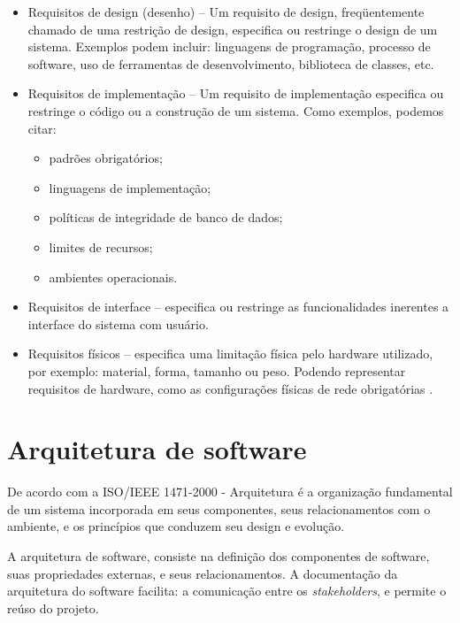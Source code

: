 \begin{itemize}
\item Requisitos de design (desenho) – Um requisito de design, freqüentemente chamado de uma restrição de design, especifica ou restringe o design de um sistema. Exemplos podem incluir: linguagens de programação, processo de software, uso de ferramentas de desenvolvimento, biblioteca de classes, etc.
\item Requisitos de implementação – Um requisito de implementação especifica ou restringe o código ou a construção de um sistema. Como exemplos, podemos citar:
\begin{itemize}

  \item padrões obrigatórios;
  \item linguagens de implementação;
  \item políticas de integridade de banco de dados;
  \item limites de recursos;
  \item ambientes operacionais.

\end{itemize}
\item Requisitos de interface – especifica ou restringe as funcionalidades inerentes a interface do sistema com usuário.
\item Requisitos físicos – especifica uma limitação física pelo hardware utilizado, por exemplo: material, forma, tamanho ou peso. Podendo representar requisitos de hardware, como as configurações físicas de rede obrigatórias \cite{rational}.
\end{itemize}

  \section{Arquitetura de software}
  \label{Sec:arquitetura}
    De acordo com a ISO/IEEE 1471-2000 - Arquitetura é a organização fundamental
  de um sistema incorporada em seus componentes, seus relacionamentos com o
  ambiente, e os princípios que conduzem seu design e evolução.

    A arquitetura de software, consiste na definição dos componentes de software,
     suas propriedades externas, e seus relacionamentos. A documentação da arquitetura do software
      facilita: a comunicação entre os \textit{stakeholders},
       e permite o reúso do projeto.
